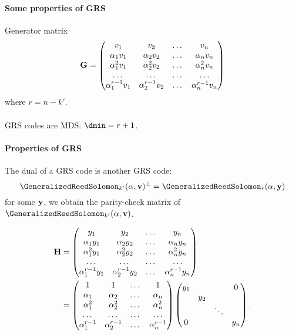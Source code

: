 \documentclass[a4paper, 11pt, openany]{book}
\begin{document}
\paragraph{Some properties of GRS}
Generator matrix
\[
	{\bf G} = \begin{pmatrix}
		v_1 & v_2 & \dots & v_n\\
		\alpha_1 v_1 & \alpha_2 v_2 & \dots &\alpha_n v_n\\
		\alpha_1^2 v_1 & \alpha_2^2 v_2 & \dots  & \alpha_n^2 v_n\\
		\dots & \dots & \dots & \dots\\
		\alpha_1^{r-1} v_1  & \alpha_2^{r-1} v_2 & \dots & \alpha_n^{r-1} v_n
	\end{pmatrix}
\]
where $r = n - k'$.\\
~\\
GRS codes are MDS: $\dmin = r + 1$.


\paragraph{Properties of GRS}
The dual of a GRS code is another GRS code:
\[
	\GeneralizedReedSolomon_{k'}( {\bf \alpha}, {\bf v} )^\perp = \GeneralizedReedSolomon_r( {\bf \alpha}, {\bf y} )
\]
for some ${\bf y}$, we obtain the parity-check matrix of $\GeneralizedReedSolomon_{k'}( {\bf \alpha}, {\bf v} )$.

\begin{align*}
	{\bf H} &= \begin{pmatrix}
		y_1 & y_2 & \dots & y_n\\
		\alpha_1 y_1 & \alpha_2 y_2 & \dots & \alpha_n y_n\\
		\alpha_1^2 y_1 & \alpha_2^2 y_2 & \dots & \alpha_n^2 y_n\\
		\dots & \dots & \dots & \dots\\
		\alpha_1^{r-1} y_1 & \alpha_2^{r-1} y_2 & \dots & \alpha_n^{r-1} y_n
	\end{pmatrix}\\
	&= \begin{pmatrix}
			1 & 1 & \dots & 1\\
			\alpha_1 & \alpha_2 & \dots & \alpha_n \\
			\alpha_1^2 & \alpha_2^2 & \dots & \alpha_n^2 \\
			\dots & \dots & \dots & \dots\\
			\alpha_1^{r-1} & \alpha_2^{r-1} & \dots & \alpha_n^{r-1}
		\end{pmatrix}
		\begin{pmatrix}
		y_1 	&  		& 		& 0		\\
		 		& y_2 	& 		&  		\\
				&		& \ddots& 		\\
		0		&		&		&y_n
		\end{pmatrix}.
\end{align*}
\end{document}
